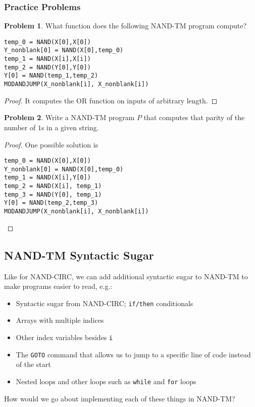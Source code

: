 \documentclass[11pt]{article}
\theoremstyle{definition}
\newtheorem{problem}{Problem}
\theoremstyle{remark}
\begin{document}
\subsubsection{Practice Problems}
\begin{problem} What function does the following NAND-TM program compute?

\begin{verbatim}
temp_0 = NAND(X[0],X[0])
Y_nonblank[0] = NAND(X[0],temp_0)
temp_1 = NAND(X[i],X[i])
temp_2 = NAND(Y[0],Y[0])
Y[0] = NAND(temp_1,temp_2)
MODANDJUMP(X_nonblank[i], X_nonblank[i])
\end{verbatim}
\end{problem}
\begin{proof}
It computes the OR function on inputs of arbitrary length.
\end{proof}

\begin{problem}Write a NAND-TM program $P$ that computes that parity of the number of $1$s in a given string.
\end{problem}
\begin{proof} One possible solution is

\begin{verbatim}
temp_0 = NAND(X[0],X[0])
Y_nonblank[0] = NAND(X[0],temp_0)
temp_1 = NAND(X[i],Y[0])
temp_2 = NAND(X[i], temp_1)
temp_3 = NAND(Y[0], temp_1)
Y[0] = NAND(temp_2,temp_3)
MODANDJUMP(X_nonblank[i], X_nonblank[i])
\end{verbatim}
\end{proof}


\newpage
\subsection{NAND-TM Syntactic Sugar}
Like for NAND-CIRC, we can add additional syntactic sugar to NAND-TM to make programs easier to read, e.g.:
\begin{itemize}
    \item Syntactic sugar from NAND-CIRC; \texttt{if/then} conditionals
    \item Arrays with multiple indices
    \item Other index variables besides \texttt{i}
    \item The \texttt{GOTO} command that allows us to jump to a specific line of code instead of the start
    \item Nested loops and other loops such as \texttt{while} and \texttt{for} loops
\end{itemize}
How would we go about implementing each of these things in NAND-TM?
\end{document}
